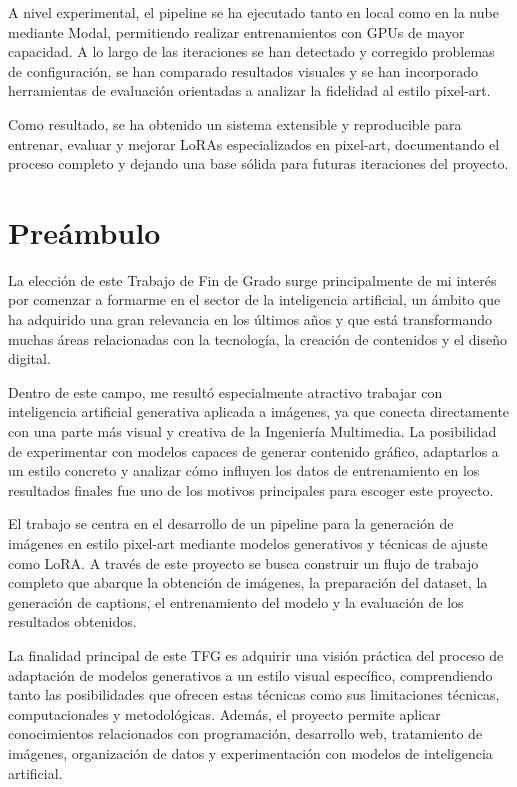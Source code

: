 \documentclass[a4paper,11pt,titlepage]{scrbook}
\begin{document}
\medskip

A nivel experimental, el pipeline se ha ejecutado tanto en local como en la nube mediante Modal, permitiendo realizar entrenamientos con GPUs de mayor capacidad. A lo largo de las iteraciones se han detectado y corregido problemas de configuración, se han comparado resultados visuales y se han incorporado herramientas de evaluación orientadas a analizar la fidelidad al estilo pixel-art.

\medskip

Como resultado, se ha obtenido un sistema extensible y reproducible para entrenar, evaluar y mejorar LoRAs especializados en pixel-art, documentando el proceso completo y dejando una base sólida para futuras iteraciones del proyecto.

\chapter*{Preámbulo}
\thispagestyle{empty}
La elección de este Trabajo de Fin de Grado surge principalmente de mi interés por comenzar a formarme en el sector de la inteligencia artificial, un ámbito que ha adquirido una gran relevancia en los últimos años y que está transformando muchas áreas relacionadas con la tecnología, la creación de contenidos y el diseño digital.

\medskip

Dentro de este campo, me resultó especialmente atractivo trabajar con inteligencia artificial generativa aplicada a imágenes, ya que conecta directamente con una parte más visual y creativa de la Ingeniería Multimedia. La posibilidad de experimentar con modelos capaces de generar contenido gráfico, adaptarlos a un estilo concreto y analizar cómo influyen los datos de entrenamiento en los resultados finales fue uno de los motivos principales para escoger este proyecto.

\medskip

El trabajo se centra en el desarrollo de un pipeline para la generación de imágenes en estilo pixel-art mediante modelos generativos y técnicas de ajuste como LoRA. A través de este proyecto se busca construir un flujo de trabajo completo que abarque la obtención de imágenes, la preparación del dataset, la generación de captions, el entrenamiento del modelo y la evaluación de los resultados obtenidos.

\medskip

La finalidad principal de este TFG es adquirir una visión práctica del proceso de adaptación de modelos generativos a un estilo visual específico, comprendiendo tanto las posibilidades que ofrecen estas técnicas como sus limitaciones técnicas, computacionales y metodológicas. Además, el proyecto permite aplicar conocimientos relacionados con programación, desarrollo web, tratamiento de imágenes, organización de datos y experimentación con modelos de inteligencia artificial.
\end{document}
